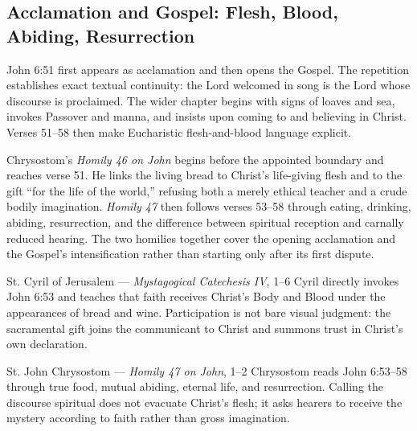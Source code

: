 \begin{deepstudy}
\subsection*{Acclamation and Gospel: Flesh, Blood, Abiding, Resurrection\enspace{}}

John 6:51 first appears as acclamation and then opens the Gospel. The repetition establishes exact textual continuity: the Lord welcomed in song is the Lord whose discourse is proclaimed. The wider chapter begins with signs of loaves and sea, invokes Passover and manna, and insists upon coming to and believing in Christ. Verses 51--58 then make Eucharistic flesh-and-blood language explicit.

Chrysostom's \emph{Homily 46 on John} begins before the appointed boundary and reaches verse 51. He links the living bread to Christ's life-giving flesh and to the gift “for the life of the world,” refusing both a merely ethical teacher and a crude bodily imagination. \emph{Homily 47} then follows verses 53--58 through eating, drinking, abiding, resurrection, and the difference between spiritual reception and carnally reduced hearing. The two homilies together cover the opening acclamation and the Gospel's intensification rather than starting only after its first dispute.

\begin{sourcecard}{St. Cyril of Jerusalem --- \emph{Mystagogical Catechesis IV}, 1--6}
Cyril directly invokes John 6:53 and teaches that faith receives Christ's Body and Blood under the appearances of bread and wine. Participation is not bare visual judgment: the sacramental gift joins the communicant to Christ and summons trust in Christ's own declaration.
\end{sourcecard}

\begin{sourcecard}{St. John Chrysostom --- \emph{Homily 47 on John}, 1--2}
Chrysostom reads John 6:53--58 through true food, mutual abiding, eternal life, and resurrection. Calling the discourse spiritual does not evacuate Christ's flesh; it asks hearers to receive the mystery according to faith rather than gross imagination.
\end{sourcecard}


\end{deepstudy}
